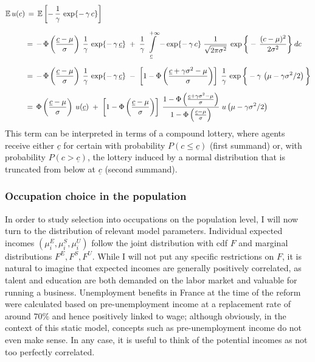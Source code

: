 \begin{align}
\mathbb{E} \,  u(c) & \, = \,  \mathbb{E}\left[- \, \frac{1}{\gamma} \,\exp\{- \,  \gamma \, c  \} \right]  \\[6pt]
& = \, -  \, \Phi\left(\frac{\underline{c} - \mu}{\sigma}\right) \: \frac{1}{\gamma} \,  \exp\{- \,  \gamma \, \underline{c}  \}   \; + \; \frac{1}{\gamma} \, 
\int\displaylimits_{\underline{c}}^{+ \infty} - \exp\{- \,  \gamma \, c  \} \; \frac{1}{\sqrt{2 \pi \sigma^2}} \: \exp\bigg\{- \, \frac{(c - \mu)^2}{2 \sigma^2} \bigg\} \: dc \\[6pt]
& = \, -  \, \Phi\left(\frac{\underline{c} - \mu}{\sigma}\right) \: \frac{1}{\gamma} \, \exp\{- \,  \gamma \, \underline{c}  \}   \; -  \; 
 \left[1 - \Phi\left(\frac{\underline{c} + \gamma \sigma^2 - \mu}{\sigma}\right) \right] \;  \frac{1}{\gamma} \, \exp\bigg\{- \gamma \, \left(\mu -  \gamma \sigma^2 /2 \right) \bigg\} \\[6pt]
& = \, \Phi\left(\frac{\underline{c} - \mu}{\sigma}\right) \: u(\underline{c})   \; +  \; \left[1 - \Phi\left(\frac{\underline{c} - \mu}{\sigma}\right) \right] \: \frac{1 - \Phi\left(\frac{\underline{c} + \gamma \sigma^2 - \mu}{\sigma}\right)}{1 - \Phi\left(\frac{\underline{c} - \mu}{\sigma}\right)} \; u\left(\mu -  \gamma \sigma^2 /2 \right)
\end{align}
This term can be interpreted in terms of a compound lottery, where agents receive either $\underline{c}$ for certain with probability $P(c \leq \underline{c})$ (first summand) or, with probability $P(c > \underline{c})$, the lottery induced by a normal distribution that is truncated from below at $\underline{c}$ (second summand). 


\subsubsection*{Occupation choice in the population}

In order to study selection into occupations on the population level, I will now turn to the distribution of relevant model parameters. Individual expected incomes $(\mu_i^E, \mu_i^S, \mu_i^U)$ follow the joint distribution with cdf $F$ and marginal distributions $F^E, F^S, F^U$. While I will not put any specific restrictions on $F$, it is natural to imagine that expected incomes are generally positively correlated, as talent and education are both demanded on the labor market and valuable for running a business. Unemployment benefits in France at the time of the reform were calculated based on pre-unemployment income at a replacement rate of around $70\%$ and hence positively linked to wage; although obviously, in the context of this static model, concepts such as pre-unemployment income do not even make sense. In any case, it is useful to think of the potential incomes as not too perfectly correlated. \newline

